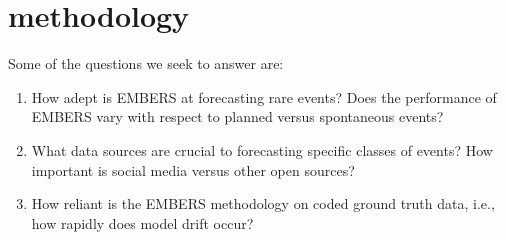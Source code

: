 \section{methodology}

Some of the questions we seek to answer are:
\begin{enumerate}
\item How adept is EMBERS at forecasting rare events? Does the performance
of EMBERS vary with respect to planned versus spontaneous events?
\item What data sources are crucial to forecasting specific classes of
events? How important is social media versus other open sources?
\item How reliant is the EMBERS methodology on coded ground truth
data, i.e., how rapidly does model drift occur?
\end{enumerate}
